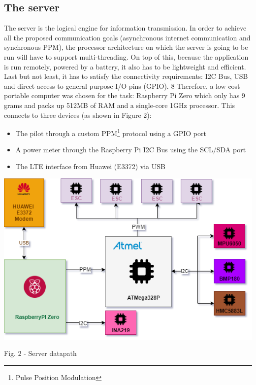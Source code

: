 \documentclass{IEEEtran}
\begin{document}
\subsection{\large{The server}}
The server is the logical engine for information transmission. In order to achieve all the proposed communication goals (asynchronous internet communication and synchronous PPM), the processor architecture on which the server is going to be run will have to support multi-threading. On top of this, because the application is run remotely, powered by a battery, it also has to be lightweight and efficient. Last but not least, it has to satisfy the connectivity requirements: I2C Bus, USB and direct access to general-purpose  I/O pins (GPIO). 
8
 Therefore, a low-cost portable computer was chosen for the task: Raspberry Pi Zero which only has 9 grams and packs up 512MB of RAM and a single-core 1GHz processor. This connects to three devices (as shown in Figure 2): 
\begin{itemize}
    \item The pilot through a custom PPM\footnote{Pulse Position Modulation} protocol using a GPIO port
    \item A power meter through the Raspberry Pi I2C Bus using the SCL/SDA port
    \item The LTE interface from Huawei (E3372) via USB
\end{itemize}
\begin{center}\includegraphics[scale=.45]{server_datapath.png}\end{center}
\begin{it}\begin{center}Fig. 2 - Server datapath \end{center}\end{it}
\end{document}
